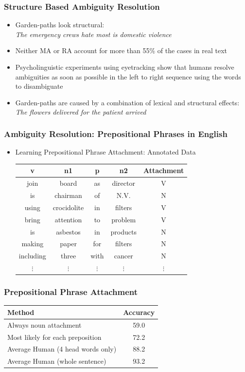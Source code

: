 \begin{frame}
\frametitle{Structure Based Ambiguity Resolution}
\begin{itemize}
  \item Garden-paths look structural:\\
  {\rm\it The emergency crews hate most is
  domestic violence}
  \item Neither MA or RA account for more than 55\% of the cases in
  real text 
  \item Psycholinguistic experiments using eyetracking show that humans resolve
  ambiguities as soon as possible in the left to right sequence using
  the words to disambiguate
  \item Garden-paths are caused by a combination of lexical and structural effects:\\ 
  {\rm\it The flowers delivered for the patient arrived}
\end{itemize}

\end{frame}

\begin{frame}
\frametitle{Ambiguity Resolution: Prepositional Phrases in English}
  \begin{itemize}
  \item Learning Prepositional Phrase Attachment: Annotated Data
\begin{tabular}{|cccc|c|}
\hline
v    &     n1   &      p & n2 &       Attachment\\
\hline
join   &   board    &   as &  director & V \\
is       & chairman  &  of  & N.V.    & N \\
using  &   crocidolite & in  & filters & V \\
bring  &   attention  & to  & problem &  V \\ 
is      &  asbestos   & in &  products & N \\
making &   paper    &   for & filters & N \\
including & three     &  with & cancer &  N \\
$\vdots$ & $\vdots$ & $\vdots$ & $\vdots$ & $\vdots$ \\
\hline
\end{tabular}
  \end{itemize}

\end{frame}

\begin{frame}
\frametitle{Prepositional Phrase Attachment}
\begin{tabular}{|l|c|}  \hline
Method & Accuracy \\ \hline
Always noun attachment & 59.0 \\
Most likely for each preposition & 72.2 \\
Average Human (4 head words only) & 88.2 \\
Average Human (whole sentence) & 93.2 \\  \hline
\end{tabular}
\end{frame}


